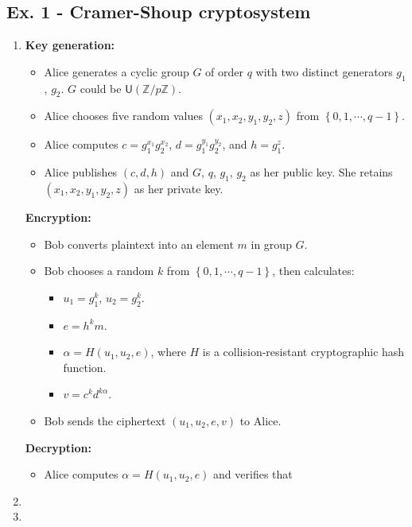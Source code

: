 \documentclass[11pt,a4paper]{article}
\begin{document}
\subsection*{Ex. 1 - Cramer-Shoup cryptosystem}
\begin{enumerate}
\item \textbf{Key generation:}
	\begin{itemize}
	\item Alice generates a cyclic group $G$ of order $q$ with two distinct generators $g_{1}$, $g_{2}$. $G$ could be $\mathsf{U}(\mathbb{Z}/p\mathbb{Z})$.
	\item Alice chooses five random values $\left( x_{1}, x_{2}, y_{1}, y_{2}, z \right)$ from $\left\lbrace 0, 1, \cdots, q-1 \right\rbrace$.
	\item Alice computes $c = g_{1}^{x_{1}}g_{2}^{x_{2}}$, $d = g_{1}^{y_{1}}g_{2}^{y_{2}}$, and $h = g_{1}^{z}$.
	\item Alice publishes $\left( c, d, h \right)$ and $G$, $q$, $g_{1}$, $g_{2}$ as her public key. She retains $\left( x_{1}, x_{2}, y_{1}, y_{2}, z \right)$ as her private key.
	\end{itemize}

\par \textbf{Encryption:}
	\begin{itemize}
	\item Bob converts plaintext into an element $m$ in group $G$.
	\item Bob chooses a random $k$ from $\left\lbrace 0, 1, \cdots, q-1 \right\rbrace$, then calculates:
		\begin{itemize}
		\item $u_{1} = g_{1}^{k}$, $u_{2} = g_{2}^{k}$.
		\item $e = h^{k}m$.
		\item $\alpha = H(u_{1}, u_{2}, e)$, where $H$ is a collision-resistant cryptographic hash function.
		\item $v = c^{k}d^{k\alpha}$.
		\end{itemize}
	\item Bob sends the ciphertext $\left( u_{1}, u_{2}, e, v \right)$ to Alice.
	\end{itemize}
	
\par \textbf{Decryption:}
	\begin{itemize}
		\item Alice computes $\alpha = H(u_{1}, u_{2}, e)$ and verifies that 
	\end{itemize}

\item 
\item
\end{enumerate}
\end{document}
